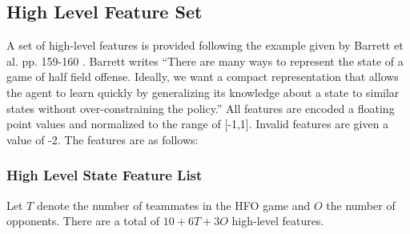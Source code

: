 \documentclass[12pt]{article}
\begin{document}
\subsection{High Level Feature Set}
A set of high-level features is provided following the example given
by Barrett et al. pp. 159-160 \cite{THESIS14-Barrett}. Barrett writes
``There are many ways to represent the state of a game of half field
offense.  Ideally, we want a compact representation that allows the
agent to learn quickly by generalizing its knowledge about a state to
similar states without over-constraining the policy.'' All features
are encoded a floating point values and normalized to the range of
[-1,1]. Invalid features are given a value of -2. The features are as
follows:

\subsubsection{High Level State Feature List}
Let $T$ denote the number of teammates in the HFO game and $O$ the
number of opponents. There are a total of $10 + 6T + 3O$ high-level
features.
\end{document}
